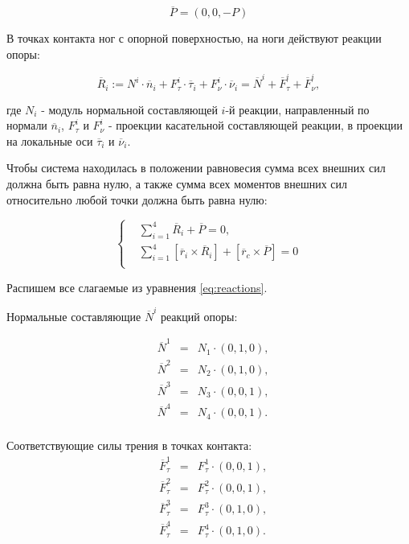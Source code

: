 \begin{equation}
\label{eq:F_c}
  \overline{P} = (0,0,-P)
\end{equation}

В точках контакта ног с опорной поверхностью, на ноги действуют реакции опоры:

\begin{equation}
\label{eq:reactions}
  \overline{R}_i := N^i\cdot\overline{n}_i + F_\tau^i\cdot\overline{\tau}_i + F_\nu^i\cdot\overline{\nu}_i = \overline{N}^i + \overline{F}_\tau^i + \overline{F}_\nu^i,
\end{equation}

где $N_i$ - модуль нормальной составляющей $i$-й реакции, направленный по нормали $\overline{n}_i$, $F_\tau^i$ и $F_\nu^i$ - проекции касательной составляющей реакции, в проекции на локальные оси $\overline{\tau}_i$ и $\overline{\nu}_i$.

Чтобы система находилась в положении равновесия сумма всех внешних сил должна быть равна нулю, а также сумма всех моментов внешних сил относительно любой точки должна быть равна нулю:

\begin{equation}
\label{eq:general_static_equations}
  \left\{
    \begin{alignedat}{3}
      &\sum_{i=1}^4\overline{R}_i+\overline{P} = 0, \\
      &\sum_{i=1}^4[\overline{r}_i\times\overline{R}_i] + [\overline{r}_c\times\overline{P}] = 0\\
    \end{alignedat}
  \right.
\end{equation}



Распишем все слагаемые из уравнения \ref{eq:reactions}.

Нормальные составляющие $\overline{N}^i$ реакций опоры:

\begin{equation}
\label{eq:N_i}
  \begin{alignedat}{3}
    &\overline{N}^1 &= &N_1\cdot(0,1,0),  \\
    &\overline{N}^2 &= &N_2\cdot(0,1,0),  \\
    &\overline{N}^3 &= &N_3\cdot(0,0,1),  \\
    &\overline{N}^4 &= &N_4\cdot(0,0,1).  \\
  \end{alignedat}
\end{equation}

Соответствующие силы трения в точках контакта:
\begin{equation}
\label{eq:F_tau_i}
  \begin{alignedat}{3}
    &\overline{F}_\tau^1 &= &F_\tau^1\cdot(0,0,1),  \\
    &\overline{F}_\tau^2 &= &F_\tau^2\cdot(0,0,1),  \\
    &\overline{F}_\tau^3 &= &F_\tau^3\cdot(0,1,0),  \\
    &\overline{F}_\tau^4 &= &F_\tau^4\cdot(0,1,0).  \\
  \end{alignedat}
\end{equation}

